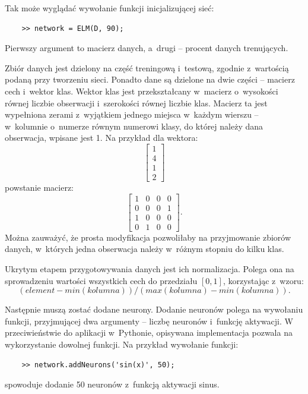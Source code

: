\documentclass{article}
\begin{document}
Tak może wyglądać wywołanie funkcji inicjalizującej sieć:
\begin{lstlisting}
	>> network = ELM(D, 90);
\end{lstlisting}
Pierwszy argument to macierz danych, a~drugi -- procent danych trenujących.

Zbiór danych jest dzielony na część treningową i~testową, zgodnie z~wartością podaną przy tworzeniu sieci. 
Ponadto dane są dzielone na dwie części -- macierz cech i~wektor klas.
Wektor klas jest przekształcany w~macierz o~wysokości równej liczbie obserwacji i~szerokości równej liczbie klas.
Macierz ta jest wypełniona zerami z~wyjątkiem jednego miejsca w~każdym wierszu -- w~kolumnie o~numerze równym numerowi klasy, do której należy dana obserwacja, wpisane jest 1.
Na przykład dla wektora:
\[ \begin{bmatrix} 1 \\ 4 \\ 1 \\ 2 \end{bmatrix}\]
powstanie macierz:
\[ \begin{bmatrix} 1&0&0&0 \\ 0&0&0&1 \\ 1&0&0&0 \\ 0&1&0&0 \end{bmatrix}.\]
Można zauważyć, że prosta modyfikacja pozwoliłaby na przyjmowanie zbiorów danych, w~których jedna obserwacja należy w~różnym stopniu do kilku klas.

Ukrytym etapem przygotowywania danych jest ich normalizacja. 
Polega ona na sprowadzeniu wartości wszystkich cech do przedziału $[0, 1]$, korzystając z~wzoru:
\[(element - min(kolumna))/(max(kolumna) - min(kolumna)).\]

Następnie muszą zostać dodane neurony.
Dodanie neuronów polega na wywołaniu funkcji, przyjmującej dwa argumenty -- liczbę neuronów i~funkcję aktywacji.
W przeciwieństwie do aplikacji w~Pythonie, opisywana implementacja pozwala na wykorzystanie dowolnej funkcji.
Na przykład wywołanie funkcji:
\begin{lstlisting}
	>> network.addNeurons('sin(x)', 50);
\end{lstlisting}
spowoduje dodanie 50 neuronów z~funkcją aktywacji sinus.
\end{document}
